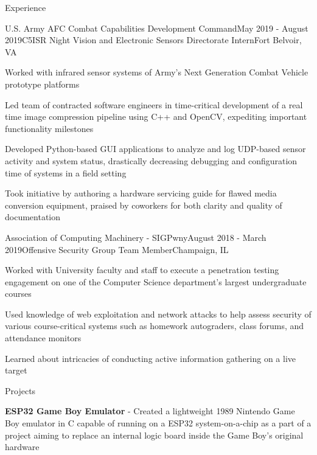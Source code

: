 \documentclass{resume} %
\begin{document}
\begin{rSection}{Experience}

\begin{rSubsection}{U.S. Army AFC Combat Capabilities Development Command}{May 2019 - August 2019}{C5ISR Night Vision and Electronic Sensors Directorate Intern}{Fort Belvoir, VA}
\item Worked with infrared sensor systems of Army's Next Generation Combat Vehicle prototype platforms 
\item Led team of contracted software engineers in time-critical development of a real time image compression pipeline using C++ and OpenCV, expediting important functionality milestones
\item Developed Python-based GUI applications to analyze and log UDP-based sensor activity and system status, drastically decreasing debugging and configuration time of systems in a field setting
\item Took initiative by authoring a hardware servicing guide for flawed media conversion equipment, praised by coworkers for both clarity and quality of documentation
\end{rSubsection}

\begin{rSubsection}{Association of Computing Machinery - SIGPwny}{August 2018 - March 2019}{Offensive Security Group Team Member}{Champaign, IL}
\item Worked with University faculty and staff to execute a penetration testing engagement on one of the Computer Science
department's largest undergraduate courses
\item Used knowledge of web exploitation and network attacks to help assess security of various course-critical
systems such as homework autograders, class forums, and attendance monitors
\item Learned about intricacies of conducting active information gathering on a live target
\end{rSubsection}


\end{rSection}

\begin{rSection}{Projects}

\item {\bf ESP32 Game Boy Emulator} - Created a lightweight 1989 Nintendo Game Boy emulator in C capable of running on a ESP32 system-on-a-chip as a part of a project aiming to replace an internal logic board inside the Game Boy's original hardware
\end{rSection}
\end{document}
